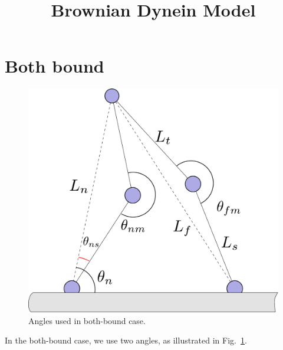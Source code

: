 \documentclass[11pt,twocolumn]{article}
\title{Brownian Dynein Model}
\begin{document}
\maketitle

\section{Both bound}

\begin{figure}
  \includegraphics[width=\columnwidth]{../figures/code-bothbound}
  \caption{Angles used in both-bound case.}\label{fig:bothbound}
\end{figure}

In the both-bound case, we use two angles, as illustrated in
Fig.~\ref{fig:bothbound}.
\end{document}
